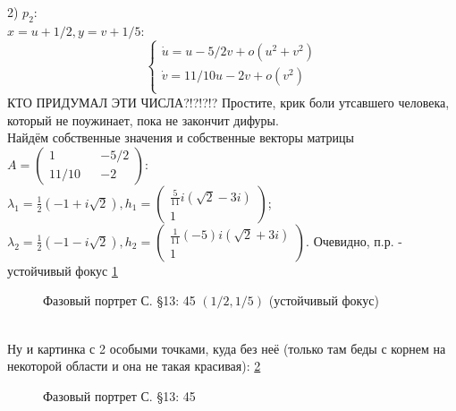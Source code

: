 \documentclass{article}
\begin{document}
2) $p_2$:\\
$x=u+1/2,y=v+1/5$:
\begin{equation}
\begin{cases}
        \dot{u}=u-5/2v+o(u^2+v^2)\\
        \dot{v}=11/10u-2v+o(v^2)\\
    \end{cases}    
\end{equation}
КТО ПРИДУМАЛ ЭТИ ЧИСЛА?!?!?!? Простите, крик боли утсавшего человека, который не поужинает, пока не закончит дифуры.\\
Найдём собственные значения и собственные векторы матрицы $A=\begin{pmatrix} 1 && -5/2 \\ 11/10 && -2 \end{pmatrix}$:\\
 $\lambda_1=\frac{1}{2} \left(-1+i \sqrt{2}\right),
 h_1 = \begin{pmatrix}\frac{5}{11} i \left(\sqrt{2}-3 i\right) \\  1 \end{pmatrix} $; 
 $\lambda_2= \frac{1}{2} \left(-1-i \sqrt{2}\right),
 h_2 = \begin{pmatrix} \frac{1}{11} (-5) i \left(\sqrt{2}+3 i\right) \\  1 \end{pmatrix} $. 
 Очевидно, п.р. - устойчивый фокус \ref{13.45.2}
 \begin{figure}[ht]
\caption{Фазовый портрет С. \S13: 45 $(1/2,1/5)$ (устойчивый фокус)}
\label{13.45.2}
\end{figure}\\  
Ну и картинка с 2 особыми точками, куда без неё (только там беды с корнем на некоторой области и она не такая красивая): \ref{13.45.3}\\
 \begin{figure}[ht]
\caption{Фазовый портрет С. \S13: 45}
\label{13.45.3}
\end{figure}\\
\end{document}
